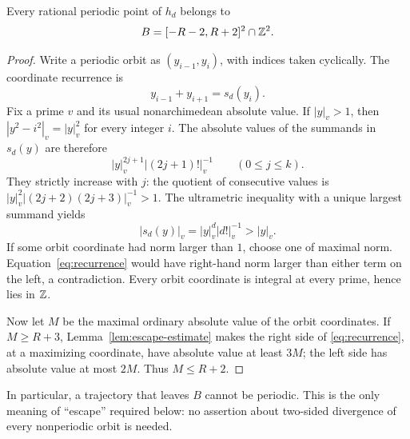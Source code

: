 \begin{proposition}
\label{prop:integer-box}
Every rational periodic point of $h_d$ belongs to
\begin{equation}\label{eq:boxes}
 B=[-R-2,R+2]^2\cap\mathbb Z^2.
\end{equation}
\end{proposition}
\begin{proof}
Write a periodic orbit as $(y_{i-1},y_i)$, with indices taken cyclically.
The coordinate recurrence is
\begin{equation}\label{eq:recurrence}
 y_{i-1}+y_{i+1}=s_d(y_i).
\end{equation}
Fix a prime $v$ and its usual nonarchimedean absolute value.
If $|y|_v>1$, then $|y^2-i^2|_v=|y|_v^2$ for every integer $i$.
The absolute values of the summands in $s_d(y)$ are therefore
\[
 |y|_v^{2j+1}|(2j+1)!|_v^{-1}\qquad(0\le j\le k).
\]
They strictly increase with $j$: the quotient of consecutive values is
$|y|_v^2|(2j+2)(2j+3)|_v^{-1}>1$.
The ultrametric inequality with a unique largest summand yields
\[
 |s_d(y)|_v=|y|_v^d|d!|_v^{-1}>|y|_v.
\]
If some orbit coordinate had norm larger than $1$, choose one of
maximal norm. Equation~\eqref{eq:recurrence} would have right-hand
norm larger than either term on the left, a contradiction.
Every orbit coordinate is integral at every prime, hence lies in $\mathbb Z$.

Now let $M$ be the maximal ordinary absolute value of the orbit
coordinates. If $M\ge R+3$, Lemma~\ref{lem:escape-estimate} makes the
right side of \eqref{eq:recurrence}, at a maximizing coordinate, have
absolute value at least $3M$; the left side has absolute value at most
$2M$. Thus $M\le R+2$.
\end{proof}

In particular, a trajectory that leaves $B$ cannot be periodic.
This is the only meaning of ``escape'' required below: no assertion
about two-sided divergence of every nonperiodic orbit is needed.

